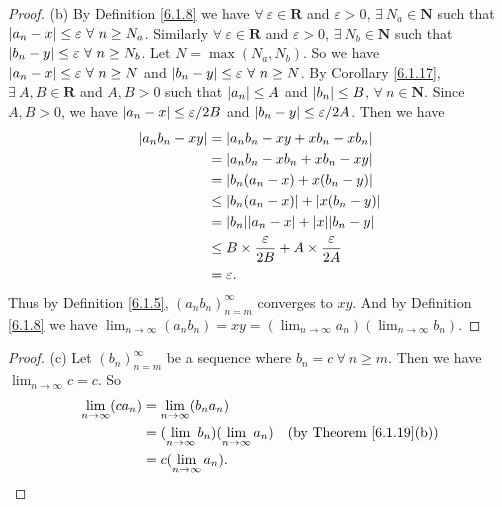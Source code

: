 \begin{proof}{(b)}
    By Definition \ref{6.1.8} we have \(\forall\ \varepsilon \in \mathbf{R}\) and \(\varepsilon > 0\), \(\exists\ N_a \in \mathbf{N}\) such that \(\abs*{a_n - x} \leq \varepsilon \ \forall\ n \geq N_a\).
    Similarly \(\forall\ \varepsilon \in \mathbf{R}\) and \(\varepsilon > 0\), \(\exists\ N_b \in \mathbf{N}\) such that \(\abs*{b_n - y} \leq \varepsilon \ \forall\ n \geq N_b\).
    Let \(N = \max(N_a, N_b)\).
    So we have \(\abs*{a_n - x} \leq \varepsilon \ \forall\ n \geq N\) and \(\abs*{b_n - y} \leq \varepsilon \ \forall\ n \geq N\).
    By Corollary \ref{6.1.17}, \(\exists\ A, B \in \mathbf{R}\) and \(A, B > 0\) such that \(\abs*{a_n} \leq A\) and \(\abs*{b_n} \leq B\), \(\forall\ n \in \mathbf{N}\).
    Since \(A, B > 0\), we have \(\abs*{a_n - x} \leq \varepsilon / 2B\) and \(\abs*{b_n - y} \leq \varepsilon / 2A\).
    Then we have
    \begin{align*}
        \abs*{a_n b_n - x y} & = \abs*{a_n b_n - x y + x b_n - x b_n}                                 \\
                             & = \abs*{a_n b_n - x b_n + x b_n - x y}                                 \\
                             & = \abs*{b_n(a_n - x) + x(b_n - y)}                                     \\
                             & \leq \abs*{b_n(a_n - x)} + \abs*{x(b_n - y)}                           \\
                             & = \abs*{b_n}\abs*{a_n - x} + \abs*{x}\abs*{b_n - y}                    \\
                             & \leq B \times \frac{\varepsilon}{2B} + A \times \frac{\varepsilon}{2A} \\
                             & = \varepsilon.
    \end{align*}
    Thus by Definition \ref{6.1.5}, \((a_n b_n)_{n = m}^\infty\) converges to \(x y\).
    And by Definition \ref{6.1.8} we have \(\lim_{n \to \infty} (a_n b_n) = x y = (\lim_{n \to \infty} a_n)(\lim_{n \to \infty} b_n)\).
\end{proof}

\begin{proof}{(c)}
    Let \((b_n)_{n = m}^\infty\) be a sequence where \(b_n = c \ \forall\ n \geq m\).
    Then we have \(\lim_{n \to \infty} c = c\).
    So
    \begin{align*}
        \lim_{n \to \infty} (c a_n) & = \lim_{n \to \infty} (b_n a_n)                                                            \\
                                    & = (\lim_{n \to \infty} b_n)(\lim_{n \to \infty} a_n) & \text{(by Theorem \ref{6.1.19}(b))} \\
                                    & = c(\lim_{n \to \infty} a_n).
    \end{align*}
\end{proof}

